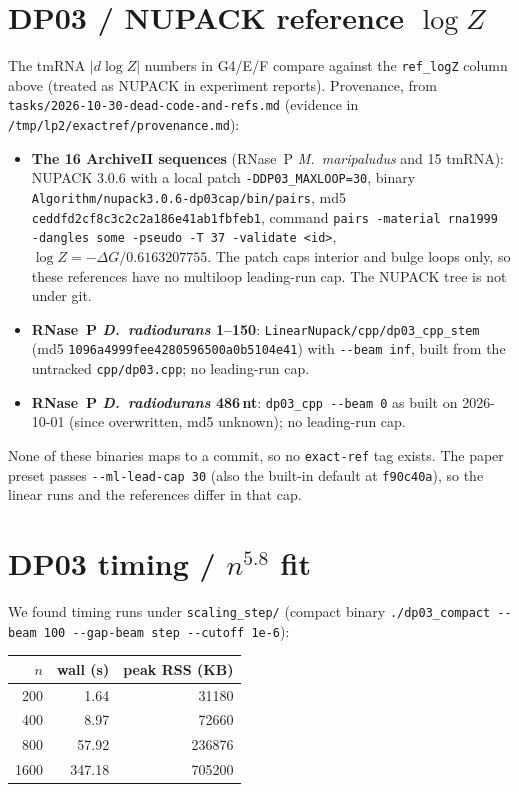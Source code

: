 \documentclass[11pt]{article}
\begin{document}
\section{DP03 / NUPACK reference $\log Z$}
The tmRNA $|d\log Z|$ numbers in G4/E/F compare against the \texttt{ref\_logZ} column above (treated as NUPACK in experiment reports). Provenance, from \texttt{tasks/2026-10-30-dead-code-and-refs.md} (evidence in \texttt{/tmp/lp2/exactref/provenance.md}):
\begin{itemize}[leftmargin=*]
  \item \textbf{The 16 ArchiveII sequences} (RNase~P \emph{M.~maripaludus} and 15 tmRNA): NUPACK 3.0.6 with a local patch \texttt{-DDP03\_MAXLOOP=30}, binary \texttt{Algorithm/nupack3.0.6-dp03cap/bin/pairs}, md5 \texttt{ceddfd2cf8c3c2c2a186e41ab1fbfeb1}, command \texttt{pairs -material rna1999 -dangles some -pseudo -T 37 -validate <id>}, $\log Z=-\Delta G/0.6163207755$. The patch caps interior and bulge loops only, so these references have no multiloop leading-run cap. The NUPACK tree is not under git.
  \item \textbf{RNase~P \emph{D.~radiodurans} 1--150}: \texttt{LinearNupack/cpp/dp03\_cpp\_stem} (md5 \texttt{1096a4999fee4280596500a0b5104e41}) with \texttt{-{}-beam inf}, built from the untracked \texttt{cpp/dp03.cpp}; no leading-run cap.
  \item \textbf{RNase~P \emph{D.~radiodurans} 486\,nt}: \texttt{dp03\_cpp -{}-beam 0} as built on 2026-10-01 (since overwritten, md5 unknown); no leading-run cap.
\end{itemize}
None of these binaries maps to a commit, so no \texttt{exact-ref} tag exists. The paper preset passes \texttt{-{}-ml-lead-cap 30} (also the built-in default at \texttt{f90c40a}), so the linear runs and the references differ in that cap.

\section{DP03 timing / $n^{5.8}$ fit}
We found timing runs under \texttt{scaling\_step/} (compact binary \texttt{./dp03\_compact -{}-beam 100 -{}-gap-beam step -{}-cutoff 1e-6}):

\begin{center}
\begin{tabular}{@{}rrr@{}}
\toprule
$n$ & wall (s) & peak RSS (KB) \\
\midrule
200 & 1.64 & 31180 \\
400 & 8.97 & 72660 \\
800 & 57.92 & 236876 \\
1600 & 347.18 & 705200 \\
\bottomrule
\end{tabular}
\end{center}
\end{document}

